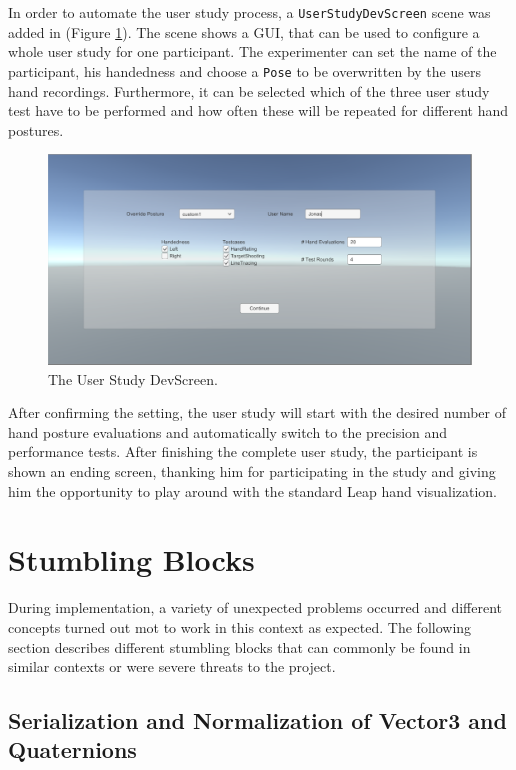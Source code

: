 In order to automate the user study process, a \texttt{UserStudyDevScreen} scene was added in (Figure \ref{fig:devscreen}). The scene shows a GUI, that can be used to configure a whole user study for one participant. The experimenter can set the name of the participant, his handedness and choose a \texttt{Pose} to be overwritten by the users hand recordings. Furthermore, it can be selected which of the three user study test have to be performed and how often these will be repeated for different hand postures. 

\begin{figure}
\centering
\includegraphics[width=\textwidth]{devscreen}
\caption{The User Study DevScreen.}
\label{fig:devscreen}
\end{figure}

After confirming the setting, the user study will start with the desired number of hand posture evaluations and automatically switch to the precision and performance tests. After finishing the complete user study, the participant is shown an ending screen, thanking him for participating in the study and giving him the opportunity to play around with the standard Leap hand visualization. 

\section{Stumbling Blocks}

During implementation, a variety of unexpected problems occurred and different concepts turned out mot to work in this context as expected. The following section describes different stumbling blocks that can commonly be found in similar contexts or were severe threats to the project. 

\subsection{Serialization and Normalization of Vector3 and Quaternions}

